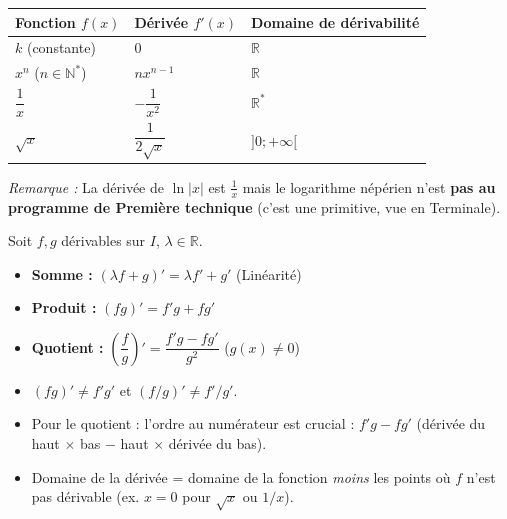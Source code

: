 \documentclass[11pt]{article}
\begin{document}
\begin{propriete}
\begin{center}
\begin{tabularx}{\linewidth}{|l|X|l|}\hline
\textbf{Fonction $f(x)$} & \textbf{Dérivée $f'(x)$} & \textbf{Domaine de dérivabilité} \\ \hline
$k$ (constante) & $0$ & $\mathbb{R}$ \\ \hline
$x^n$ ($n \in \mathbb{N}^*$) & $n x^{n-1}$ & $\mathbb{R}$ \\ \hline
$\dfrac{1}{x}$ & $-\dfrac{1}{x^2}$ & $\mathbb{R}^*$ \\ \hline
$\sqrt{x}$ & $\dfrac{1}{2\sqrt{x}}$ & $]0;+\infty[$ \\ \hline
\end{tabularx}
\end{center}
\emph{Remarque :} La dérivée de $\ln|x|$ est $\frac{1}{x}$ mais le logarithme népérien n'est \textbf{pas au programme de Première technique} (c'est une primitive, vue en Terminale).
\end{propriete}

\begin{aretenir}
Soit $f, g$ dérivables sur $I$, $\lambda \in \mathbb{R}$.
\begin{itemize}
    \item \textbf{Somme :} $(\lambda f + g)' = \lambda f' + g'$ \quad (Linéarité)
    \item \textbf{Produit :} $(fg)' = f'g + fg'$
    \item \textbf{Quotient :} $\left(\dfrac{f}{g}\right)' = \dfrac{f'g - fg'}{g^2}$ \quad ($g(x) \neq 0$)
\end{itemize}
\end{aretenir}

\begin{attention}
\begin{itemize}
    \item $(fg)' \neq f'g'$ et $(f/g)' \neq f'/g'$.
    \item Pour le quotient : l'ordre au numérateur est crucial : $f'g - fg'$ (dérivée du haut $\times$ bas $-$ haut $\times$ dérivée du bas).
    \item Domaine de la dérivée = domaine de la fonction \emph{moins} les points où $f$ n'est pas dérivable (ex. $x=0$ pour $\sqrt{x}$ ou $1/x$).
\end{itemize}
\end{attention}
\end{document}
